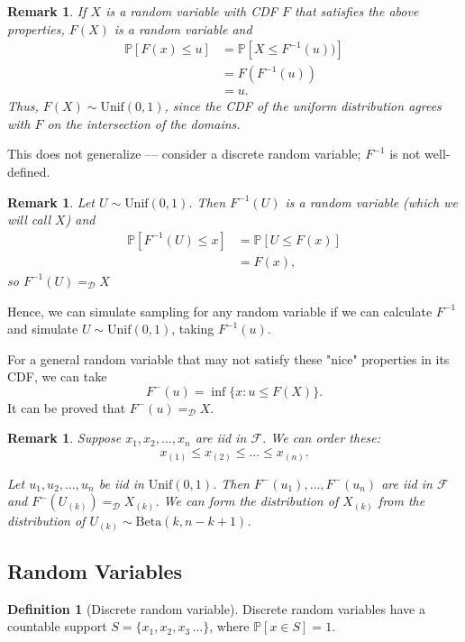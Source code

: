 \documentclass{tufte-handout}
\renewcommand{\P}{\mathbb{P}}
\newtheorem{rmk}[thm]{Remark}
\theoremstyle{definition}
\newtheorem{defn}[thm]{Definition}
\begin{document}
\begin{rmk}
	If $X$ is a random variable with CDF $F$ that satisfies the above properties, $F(X)$ is a random variable and
	\begin{align*}
		\P\left[F(x) \le u\right] &= \P\left[X \le F^{-1}(u))\right]  \\
		&= F(F^{-1}(u)) \\
		&= u
	.\end{align*}
	Thus, $F(X) \sim \text{Unif}(0,1)$, since the CDF of the uniform distribution agrees with $F$ on the intersection of the domains.
\end{rmk}

This does not generalize --- consider a discrete random variable; $F^{-1}$ is not well-defined.

\begin{rmk}
	Let $U \sim \text{Unif}(0,1)$. Then $F^{-1}(U)$ is a random variable (which we will call $X$) and
	\begin{align*}
		\P\left[F^{-1}(U) \le x\right] &= \P\left[U \le F(x)\right]  \\
		&= F(x),
	\end{align*}
	so $F^{-1}(U) =_{\mathscr{D}} X$
\end{rmk}

Hence, we can simulate sampling for any random variable if we can calculate $F^{-1}$ and simulate $U \sim \text{Unif}(0,1)$, taking $F^{-1}(u)$.

For a general random variable that may not satisfy these "nice" properties in its CDF, we can take \[
	F^{-}(u) = \inf \{x: u \le F(X)\}
.\]	It can be proved that $F^{-}(u) =_{\mathscr{D}} X$.

\begin{rmk}
	Suppose $x_1, x_2,\ldots,x_n$ are iid in $\mathscr{F}$. We can order these: \[
		x_{(1)} \le x_{(2)} \le \ldots \le x_{(n)}
	.\] 

	Let $u_1, u_2, \ldots, u_n$ be iid in $\text{Unif}(0,1)$. Then $F^-(u_1),\ldots, F^-(u_n)$ are iid in $\mathscr{F}$ and $F^-(U_{(k)}) =_{\mathscr{D}} X_{(k)}$. We can form the distribution of $X_{(k)}$ from the distribution of $U_{(k)} \sim \text{Beta}(k, n-k+1)$.
\end{rmk}

\subsection{Random Variables}
\begin{defn}[Discrete random variable]
	Discrete random variables have a countable support $S = \{x_1,x_2,x_3\,\ldots\}$, where $\P\left[ x \in S\right] = 1$.
\end{defn}
\end{document}
